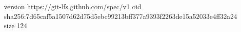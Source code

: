 version https://git-lfs.github.com/spec/v1
oid sha256:7d65caf5a1507d62d75d5ebc99213bff377a9393f2263de15a52033e4ff32a24
size 124
